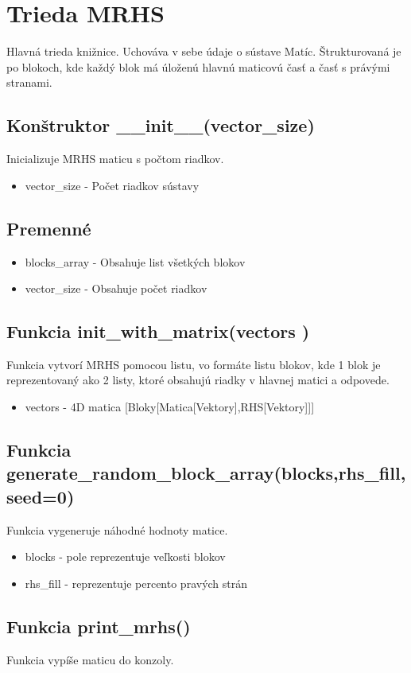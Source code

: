 \section{Trieda MRHS}

Hlavná trieda knižnice. Uchováva v sebe údaje o sústave Matíc. Štrukturovaná je po blokoch, kde každý blok má úloženú hlavnú maticovú časť a časť s právými stranami.
\subsection{Konštruktor \_\_init\_\_(vector\_size)}
Inicializuje MRHS maticu s počtom riadkov.
\begin{itemize}
    \item vector\_size - Počet riadkov sústavy
\end{itemize}

\subsection{Premenné}
\begin{itemize}
    \item blocks\_array - Obsahuje list všetkých blokov
    \item vector\_size - Obsahuje počet riadkov
\end{itemize}
\subsection{Funkcia init\_with\_matrix(vectors )}
Funkcia vytvorí MRHS pomocou listu, vo formáte listu blokov, kde 1 blok je reprezentovaný ako 2 listy, ktoré obsahujú riadky v hlavnej matici a odpovede.
\begin{itemize}
    \item vectors - 4D matica [Bloky[Matica[Vektory],RHS[Vektory]]]
\end{itemize}
\subsection{Funkcia generate\_random\_block\_array(blocks,rhs\_fill,seed=0)}
Funkcia vygeneruje náhodné hodnoty matice.
\begin{itemize}
    \item blocks - pole reprezentuje veľkosti blokov
    \item rhs\_fill - reprezentuje percento pravých strán
\end{itemize}


\subsection{Funkcia print\_mrhs()}
Funkcia vypíše maticu do konzoly.

